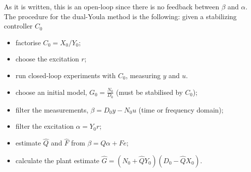As it is written, this is an open-loop since there is no feedback between $\beta$ and $\alpha$. The procedure for the dual-Youla method is the following: given a stabilizing controller $C_0$
\begin{itemize}
\item factorise $C_0 = X_0/Y_0$;
\item choose the excitation $r$;
\item run closed-loop experiments with $C_0$, measuring $y$ and $u$.
\item choose an initial model, $G_0 = \frac{N_0}{D_0}$ (must be stabilised by $C_0$);
\item filter the measurements, $\beta = D_0y - N_0u$ (time or frequency domain);
\item filter the excitation $\alpha = Y_0r$;
\item estimate $\hat{Q}$ and $\hat{F}$ from $\beta = Q\alpha + Fe$;
\item calculate the plant estimate $\hat{G} = (N_0+\hat{Q}Y_0)(D_0 - \hat{Q}X_0)$.
\end{itemize}

\iffalse
\section{Ratio of Distributions}
\label{sec:ratios}

if no reference the estimate is the controller. Taking more data does not help (why?)

Ratio distributions

What is the problem with the statistics?

X and Y are stochastics independent and uncorrlated variables: what is $X/Y$? The proble is because $\EE{\frac{1}{Y}} \neq \frac{1}{\EE{Y}}$

The Cauchy distribution is
\begin{equation*}
  \frac{1}{\pi}
\end{equation*}
but it does not have the mean value $\int z f(z)\du z$

Bias should not be used but rather consistency when there is a non-linear transofrmation

When taking more data, the probability of hitting the zero at the denominator is small. The right question is what is the probabilty of making an error larger than a specified $\epsilon$.
\fi

